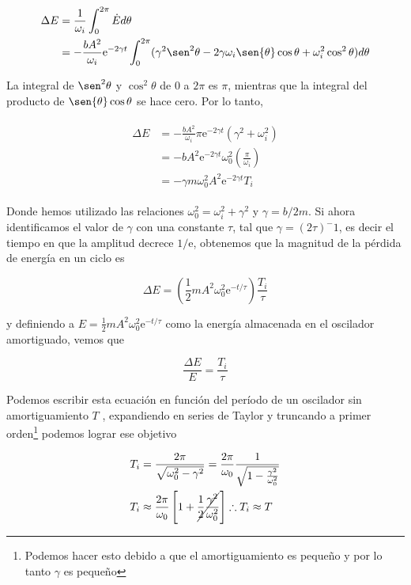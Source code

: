 \documentclass[a4paper,10pt]{article}
\numberwithin{equation}{section}
\newcommand{\euler}{\mathrm{e}}
\begin{document}
\begin{align}
 \begin{split}
  \Delta E &= \frac{1}{\omega_i} \int_0^{2\pi} \dot{E} d\theta \\
  &= - \frac{bA^2}{\omega_i}\euler^{-2\gamma t}\int_0^{2\pi} 
  (\gamma^2 \sen^2{\theta} - 2\gamma \omega_i \sen{\theta} \cos{\theta} + \omega_i^2 \cos^2{\theta}) d\theta
 \end{split}
\end{align}

La integral de $\sen^2{\theta}$ y $ \cos^2{\theta}$ de 0 a $2\pi$ es $\pi$, mientras
que la integral del producto de $\sen{\theta}\cos{\theta}$ se hace cero. Por lo tanto,

\begin{align}
 \begin{split}
  \Delta E &= - \frac{bA^2}{\omega_i}\pi \euler^{-2\gamma t}(\gamma^2 + \omega_i^2) \\
  &= - b A^2 \euler^{-2\gamma t}\omega_0^2\left(\frac{\pi}{\omega_i}\right) \\
  &= - \gamma m \omega_0^2 A^2 \euler^{-2\gamma t}T_i
 \end{split}
\end{align}

Donde hemos utilizado las relaciones $\omega_0^2 = \omega_i^2 + \gamma^2$ y
$\gamma = b/2m$. Si ahora identificamos el valor de $\gamma$ con una
constante $\tau$, tal que $\gamma = (2\tau)^-1$, es decir el tiempo en que 
la amplitud decrece $1/\euler$, obtenemos que la magnitud de la pérdida de energía 
en un ciclo es

$$
\Delta E = \left(\frac{1}{2} mA^2\omega_0^2\euler^{-t/\tau}\right)\frac{T_i}{\tau}
$$

y definiendo a $E=\frac{1}{2}mA^2\omega_0^2\euler^{-t/\tau}$ como la energía
almacenada en el oscilador amortiguado, vemos que 

\begin{equation}
 \frac{\Delta E}{E} = \frac{T_i}{\tau}
\end{equation}

Podemos escribir esta ecuación en función del período de un oscilador sin amortiguamiento $T$
, expandiendo en series de Taylor y truncando a primer orden\footnote{Podemos hacer esto debido
a que el amortiguamiento es pequeño y por lo tanto $\gamma$ es pequeño} podemos 
lograr ese objetivo

\begin{align*}
 \begin{split}
  T_i &= \frac{2\pi}{\sqrt{\omega_0^2-\gamma^2}} = \frac{2\pi}{\omega_0}\frac{1}{\sqrt{1-\frac{\gamma^2}{\omega_0^2}}} \\
  T_i &\approx \frac{2\pi}{\omega_0} \left[1 + \cancel{\frac{1}{2}\frac{\gamma^2}{\omega_0^2}} \right]
  \therefore T_i \approx T
 \end{split}
\end{align*}
\end{document}
